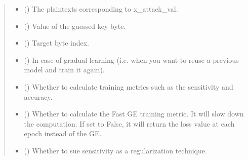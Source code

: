 \documentclass[letterpaper,10pt,english]{sphinxmanual}
\begin{document}
\begin{fulllineitems}
\begin{fulllineitems}
\begin{quote}
\begin{description}
\begin{itemize}
\item {} 
\sphinxAtStartPar
{} (\sphinxstyleliteralemphasis{\sphinxupquote{{[}}}\sphinxstyleliteralemphasis{\sphinxupquote{{[}}}\sphinxstyleliteralemphasis{\sphinxupquote{{]}}}\sphinxstyleliteralemphasis{\sphinxupquote{{]}}}) \textendash{} The plaintexts corresponding to x\_attack\_val.

\item {} 
\sphinxAtStartPar
{} () \textendash{} Value of the guessed key byte.

\item {} 
\sphinxAtStartPar
{} () \textendash{} Target byte index.

\item {} 
\sphinxAtStartPar
{} (\sphinxstyleliteralemphasis{\sphinxupquote{, }}) \textendash{} In case of gradual learning (i.e. when you want to re\sphinxhyphen{}use a previous model and train it again).

\item {} 
\sphinxAtStartPar
{} (\sphinxstyleliteralemphasis{\sphinxupquote{, }}) \textendash{} Whether to calculate training metrics such as the sensitivity and accuracy.

\item {} 
\sphinxAtStartPar
{} (\sphinxstyleliteralemphasis{\sphinxupquote{, }}) \textendash{} Whether to calculate the Fast GE training metric. It will slow down the computation. If set to
False, it will return the loss value at each epoch instead of the GE.

\item {} 
\sphinxAtStartPar
{} (\sphinxstyleliteralemphasis{\sphinxupquote{, }}) \textendash{} Whether to sue sensitivity as a regularization technique.


\end{itemize}
\end{description}
\end{quote}
\end{fulllineitems}
\end{fulllineitems}
\end{document}
